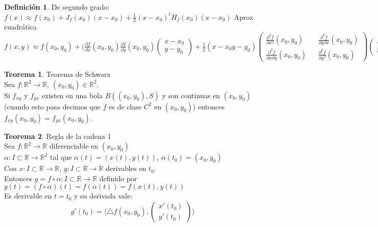 \documentclass[10pt]{article}
\theoremstyle{definition}
\newtheorem{definition}{Definición}[section]
\newtheorem{theorem}{Teorema}[section]
\begin{document}
\begin{definition}
    De segundo grado:
    \\$f(x)\approx f(x_0)+J_f(x_0)(x-x_0)+\frac{1}{2}(x-x_0)^tH_f(x_0)(x-x_0)$ Aprox cuadrática
    \\$f(x,y)\approx f(x_0,y_0)+(\frac{\partial f}{\partial x}(x_0,y_0)\frac{\partial f}{\partial y}(x_0,y_0)\begin{pmatrix} x-x_0 \\ y-y_0 \end{pmatrix} +\frac{1}{2}(x-x_0 y-y_0) \begin{pmatrix} \frac{\partial^2 f}{\partial x^2} (x_0,y_0) && \frac{\partial^2 f}{\partial y \partial x} (x_0,y_0) \\ \frac{\partial^2 f}{\partial x \partial y}(x_0,y_0) && \frac{\partial^2 f}{\partial y^2} (x_0,y_0)\end{pmatrix} \begin{pmatrix} x-x_0 \\ y-y_0 \end{pmatrix} $
\end{definition}
\begin{theorem}{Teorema de Schwarz}
    \\Sea $f:\mathbb{R}^2\to\mathbb{R}$, $(x_0,y_0)\in\mathbb{R}^2$.
    \\Si $f_{xy}$ y $f_{yx}$ existen en una bola $B((x_0,y_0),S)$ y son continuas en $(x_0,y_0)$ (cuando esto pasa decimos que $f$ es de clase $C^2$ en $(x_0,y_0)$) entonces $f_{xy}(x_0,y_0)=f_{yx}(x_0,y_0)$.
\end{theorem}
\begin{theorem}{Regla de la cadena 1}
    \\Sea $f:\mathbb{R}^2\to\mathbb{R}$ diferenciable en $(x_0,y_0)$
    \\$\alpha:I\subset\mathbb{R}\to\mathbb{R}^2$ tal que $\alpha(t)=(x(t),y(t))$, $\alpha(t_0)=(x_0,y_0)$
    \\Con $x:I\subset\mathbb{R}\to\mathbb{R}$, $y:I\subset\mathbb{R}\to\mathbb{R}$ derivables en $t_0$.
    \\Entonces $g=f\circ\alpha:I\subset\mathbb{R}\to\mathbb{R}$ definido por $g(t)=(f\circ\alpha)(t)=f(\alpha(t))=f(x(t),y(t))$\\
    Es derivable en $t=t_0$ y su derivada vale: $$g'(t_0)=\langle\triangle f(x_0,y_0),\begin{pmatrix} x'(t_0)\\y'(t_0) \end{pmatrix}\rangle $$
\end{theorem}
\end{document}
